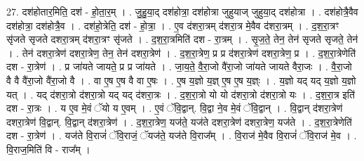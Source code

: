 \documentclass[17pt]{extarticle}
\begin{document}
27. दश॑होतार॒मिति॒ दश॑ - हो॒ता॒र॒म् । . जु॒हु॒या॒द् दश॑होत्रा॒ दश॑होत्रा जुहुयाज् जुहुया॒द् दश॑होत्रा । . दश॑होत्रै॒वैव दश॑होत्रा॒ दश॑होत्रै॒व । . दश॑हो॒त्रेति॒ दश॑ - हो॒त्रा॒ । . ए॒व द॑शरा॒त्रम् द॑शरा॒त्र मे॒वैव द॑शरा॒त्रम् । . द॒श॒रा॒त्रꣳ सृ॑जते सृजते दशरा॒त्रम् द॑शरा॒त्रꣳ सृ॑जते । . द॒श॒रा॒त्रमिति॑ दश - रा॒त्रम् । . सृ॒ज॒ते॒ तेन॒ तेन॑ सृजते सृजते॒ तेन॑ । . तेन॑ दशरा॒त्रेण॑ दशरा॒त्रेण॒ तेन॒ तेन॑ दशरा॒त्रेण॑ । . द॒श॒रा॒त्रेण॒ प्र प्र द॑शरा॒त्रेण॑ दशरा॒त्रेण॒ प्र । . द॒श॒रा॒त्रेणेति॑ दश - रा॒त्रेण॑ । . प्र जा॑यते जायते॒ प्र प्र जा॑यते । . जा॒य॒ते॒ वै॒रा॒जो वै॑रा॒जो जा॑यते जायते वैरा॒जः । . वै॒रा॒जो वै वै वै॑रा॒जो वै॑रा॒जो वै । . वा ए॒ष ए॒ष वै वा ए॒षः । . ए॒ष य॒ज्ञो य॒ज्ञ् ए॒ष ए॒ष य॒ज्ञ्ः । . य॒ज्ञो यद् यद् य॒ज्ञो य॒ज्ञो यत् । . यद् द॑शरा॒त्रो द॑शरा॒त्रो यद् यद् द॑शरा॒त्रः । . द॒श॒रा॒त्रो यो यो द॑शरा॒त्रो द॑शरा॒त्रो यः । . द॒श॒रा॒त्र इति॑ दश - रा॒त्रः । . य ए॒व मे॒वं ॅयो य ए॒वम् । . ए॒वं ॅवि॒द्वान्. वि॒द्वा ने॒व मे॒वं ॅवि॒द्वान् । . वि॒द्वान् द॑शरा॒त्रेण॑ दशरा॒त्रेण॑ वि॒द्वान्. वि॒द्वान् द॑शरा॒त्रेण॑ । . द॒श॒रा॒त्रेण॒ यज॑ते॒ यज॑ते दशरा॒त्रेण॑ दशरा॒त्रेण॒ यज॑ते । . द॒श॒रा॒त्रेणेति॑ दश - रा॒त्रेण॑ । . यज॑ते वि॒राजं॑ ॅवि॒राजं॒ ॅयज॑ते॒ यज॑ते वि॒राज᳚म् । . वि॒राज॑ मे॒वैव वि॒राजं॑ ॅवि॒राज॑ मे॒व । . वि॒राज॒मिति॑ वि - राज᳚म् । \newline
\end{document}

